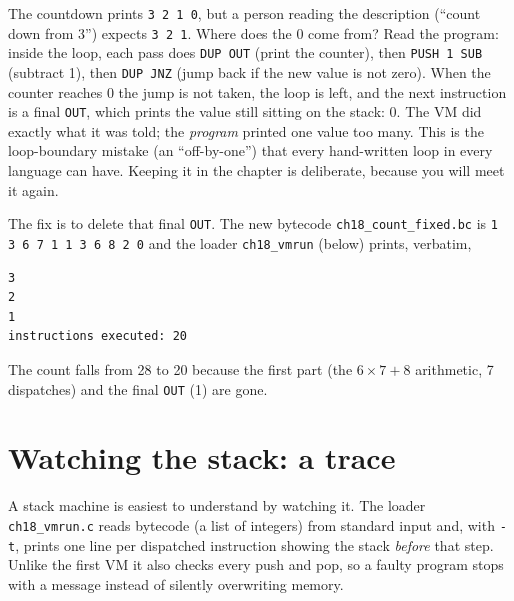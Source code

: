 \begin{example}
The countdown prints \texttt{3 2 1 0}, but a person reading the
description (``count down from 3'') expects \texttt{3 2 1}. Where does
the 0 come from? Read the program: inside the loop, each pass does
\texttt{DUP OUT} (print the counter), then \texttt{PUSH 1 SUB} (subtract
1), then \texttt{DUP JNZ} (jump back if the new value is not zero).
When the counter reaches 0 the jump is not taken, the loop is left,
and the next instruction is a final \texttt{OUT}, which prints the
value still sitting on the stack: 0. The VM did exactly what it was told;
the \emph{program} printed one value too many. This is the
loop-boundary mistake (an ``off-by-one'') that every hand-written
loop in every language can have. Keeping it in the chapter is
deliberate, because you will meet it again.

The fix is to delete that final \texttt{OUT}. The new bytecode
\texttt{ch18\_count\_fixed.bc} is \texttt{1 3 6 7 1 1 3 6 8 2 0} and
the loader \texttt{ch18\_vmrun} (below) prints, verbatim,
\begin{verbatim}
3
2
1
instructions executed: 20
\end{verbatim}
The count falls from 28 to 20 because the first part (the $6\times7+8$ arithmetic,
7 dispatches) and the final \texttt{OUT} (1) are gone.
\end{example}

\section{Watching the stack: a trace}


A stack machine is easiest to understand by watching it. The
loader \texttt{ch18\_vmrun.c} reads bytecode (a list of integers)
from standard input and, with \texttt{-t}, prints one line per
dispatched instruction showing the stack \emph{before} that step.
Unlike the first VM it also checks every push and pop, so a faulty
program stops with a message instead of silently overwriting memory.



